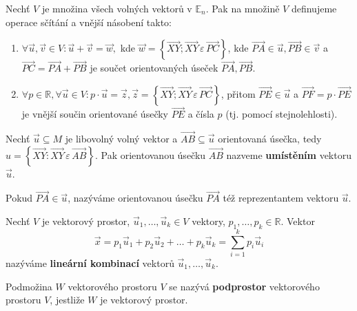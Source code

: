 \begin{definition}
    Nechť $V$ je množina všech volných vektorů v $\mathbb E_n$. Pak na množině $V$ definujeme
    operace sčítání a vnější násobení takto:
    \begin{enumerate}[$i.$]
    \item $\forall \vec u, \vec v \in V: \vec u + \vec v = \vec w,$ kde $\vec w = \left \{ \overrightarrow{XY}; \overrightarrow{XY} \, \varepsilon \, \overrightarrow{PC} \right \} $, kde $\overrightarrow{PA}\in\vec u, \overrightarrow{PB}\in \vec v$ a $\overrightarrow{PC}=\overrightarrow{PA}+\overrightarrow{PB}$ je součet orientovaných úseček $\overrightarrow{PA},\overrightarrow{PB}.$
   	\item $\forall p \in \mathbb R, \forall \vec u \in V: p\cdot \vec u = \vec z, \vec z = \left \{ \overrightarrow{XY}; \overrightarrow{XY} \, \varepsilon \, \overrightarrow{PC} \right \} $, přitom $\overrightarrow{PE}\in \vec u$ a $\overrightarrow{PF} = p\cdot \overrightarrow{PE}$ je vnější součin orientované úsečky $\overrightarrow{PE}$ a čísla $p$ (tj. pomocí stejnolehlosti).
    \end{enumerate}
\end{definition}

\begin{definition}
Nechť $\vec u \subseteq M$ je libovolný volný vektor a $\overrightarrow{AB}\subseteq \vec u$ orientovaná úsečka, tedy
$u =\left  \{ \overrightarrow{XY} : \overrightarrow{XY} \, \varepsilon \, \overrightarrow{AB} \right \}$. Pak orientovanou úsečku $\overrightarrow{AB}$ nazveme \textbf{umístěním} vektoru $\vec u$.
\end{definition}

\begin{definition}
    Pokud $\overrightarrow{PA}\in \vec u$, nazýváme orientovanou úsečku $\overrightarrow{PA}$ též reprezentantem vektoru $\vec u$.
\end{definition}

\begin{definition}
    Nechť $V$ je vektorový prostor, $\vec u_1,\dots, \vec u_k\in V$ vektory, $p_1,\dots,
    p_k\in \mathbb R.$ Vektor
    $$\vec x = p_1\vec u_1 + p_2\vec u_2 + \dots + p_k\vec u_k = \sum_{i=1}^{k} p_i\vec u_i$$
    nazýváme \textbf{lineární kombinací} vektorů $\vec u_1,\dots, \vec u_k.$
\end{definition}

\begin{definition}
    Podmožina $W$ vektorového prostoru $V$ se nazývá \textbf{podprostor} vektorového
    prostoru $V$, jestliže $W$ je vektorový prostor.
\end{definition}

